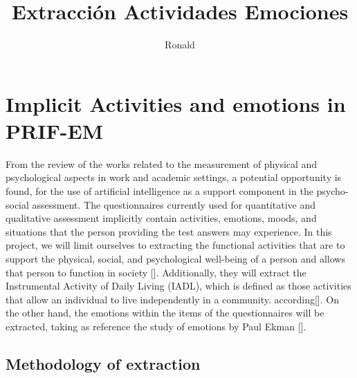 \documentclass[]{article}
\title{Extracción Actividades Emociones}
\author{Ronald}
\date{}
\begin{document}
\maketitle

\hypertarget{implicit-activities-and-emotions-in-prif-em}{%
\section{Implicit Activities and emotions in
PRIF-EM}\label{implicit-activities-and-emotions-in-prif-em}}

From the review of the works related to the measurement of physical and
psychological aspects in work and academic settings, a potential
opportunity is found, for the use of artificial intelligence as a
support component in the psycho-social assessment. The questionnaires
currently used for quantitative and qualitative assessment implicitly
contain activities, emotions, moods, and situations that the person
providing the test answers may experience. In this project, we will
limit ourselves to extracting the functional activities that are to
support the physical, social, and psychological well-being of a person
and allows that person to function in society {[}{]}. Additionally, they
will extract the Instrumental Activity of Daily Living (IADL), which is
defined as those activities that allow an individual to live
independently in a community. according{[}{]}. On the other hand, the
emotions within the items of the questionnaires will be extracted,
taking as reference the study of emotions by Paul Ekman {[}{]}.

\hypertarget{methodology-of-extraction}{%
\subsection{Methodology of extraction}\label{methodology-of-extraction}}
\end{document}
